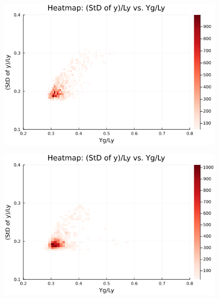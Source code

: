 \begin{figure}[H]
  \centering
  \includegraphics[scale=0.6]{image/RaRtmap_heat/2023-11-14T20:07:58.625__chi1.265_Ay50_rho0.4_T0.43_dT0.04_Rd0.0_Rt0.0_Ra0.938769_g0.0003999718779659611_run4.0e7_output.png}
  \label{}
\end{figure}

\begin{figure}[H]
  \centering
  \includegraphics[scale=0.6]{image/RaRtmap_heat/2023-11-14T21:01:09.992__chi1.265_Ay50_rho0.4_T0.43_dT0.04_Rd0.0_Rt0.0_Ra1.4081535_g0.0003999718779659611_run4.0e7_output.png}
  \label{}
\end{figure}

